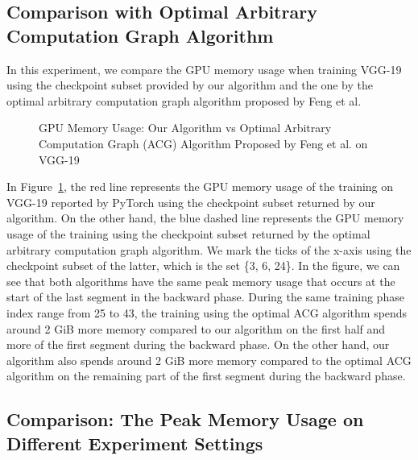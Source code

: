 \subsection{Comparison with Optimal Arbitrary Computation Graph Algorithm}

In this experiment, we compare the GPU memory usage when training VGG-19 using the checkpoint subset provided by our algorithm and the one by the optimal arbitrary computation graph algorithm proposed by Feng et al.

\begin{figure}[h!tb]
    \centering
    
    \caption{GPU Memory Usage: Our Algorithm vs Optimal Arbitrary Computation Graph (ACG) Algorithm Proposed by Feng et al. on VGG-19} 
    \label{fig:our_algo_vs_optimal_ACG}
\end{figure}

In Figure~\ref{fig:our_algo_vs_optimal_ACG}, the red line represents the GPU memory usage of the training on VGG-19 reported by PyTorch using the checkpoint subset returned by our algorithm. On the other hand, the blue dashed line represents the GPU memory usage of the training using the checkpoint subset returned by the optimal arbitrary computation graph algorithm. We mark the ticks of the x-axis using the checkpoint subset of the latter, which is the set \{3, 6, 24\}.
In the figure, we can see that both algorithms have the same peak memory usage that occurs at the start of the last segment in the backward phase. During the same training phase index range from 25 to 43, the training using the optimal ACG algorithm spends around 2 GiB more memory compared to our algorithm on the first half and more of the first segment during the backward phase. On the other hand, our algorithm also spends around 2 GiB more memory compared to the optimal ACG algorithm on the remaining part of the first segment during the backward phase.

\subsection{Comparison: The Peak Memory Usage on Different Experiment Settings}

